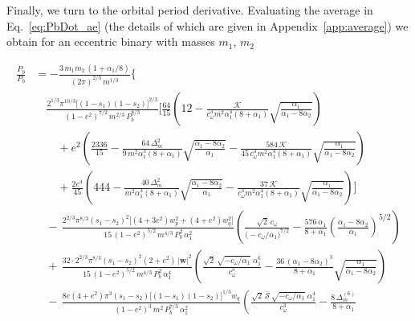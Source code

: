 \documentclass[
    floats,
    floatfix,
    amssymb,
    prd,
    twocolumn,
    superscriptaddress,
    nofootinbib,
    unicode,
    colorlinks=true,
    linktocpage=true
]{revtex4-2}
\begin{document}
Finally, we turn to the orbital period derivative. Evaluating the average in 
Eq.~\eqref{eq:PbDot_ae} (the details of which are given in 
Appendix~\ref{app:average}) we obtain for an eccentric binary with masses $m_1$, $m_2$
\begin{widetext}
\begin{equation}
\begin{split}
\frac{\dot P_b}{P_b} &=
  -\frac{3\,m_1 m_2\,(1+\alpha_1/8)}{(2\pi)^{2/3}\,m^{1/3}}
  \Biggl\{
\\[4pt]
&\quad
  \frac{2^{1/3}\pi^{10/3}\bigl[(1-s_1)(1-s_2)\bigr]^{2/3}}
       {(1-e^2)^{7/2}\,m^{2/3}\,P_b^{8/3}}
  \Biggl[
    \frac{64}{15}\!\left(12
      - \frac{\mathcal{K}}{c_\omega^3 m^2\alpha_1^4(8+\alpha_1)}
        \sqrt{\frac{\alpha_1}{\alpha_1-8\alpha_2}}
      \right)
\\&\qquad
    + e^2\!\left(
        \frac{2336}{15}
        - \frac{64\,\Delta_m^2}{9\,m^2\alpha_1^3(8+\alpha_1)}
          \sqrt{\frac{\alpha_1-8\alpha_2}{\alpha_1}}
        - \frac{584\,\mathcal{K}}{45\,c_\omega^3 m^2\alpha_1^4(8+\alpha_1)}
          \sqrt{\frac{\alpha_1}{\alpha_1-8\alpha_2}}
      \right)
\\&\qquad
    + \frac{2e^4}{45}\!\left(444
        - \frac{40\,\Delta_m^2}{m^2\alpha_1^3(8+\alpha_1)}
          \sqrt{\frac{\alpha_1-8\alpha_2}{\alpha_1}}
        - \frac{37\,\mathcal{K}}{c_\omega^3 m^2\alpha_1^4(8+\alpha_1)}
          \sqrt{\frac{\alpha_1}{\alpha_1-8\alpha_2}}
      \right)
  \Biggr]
\\[4pt]
&\quad
  -\,\frac{2^{2/3}\pi^{8/3}(s_1-s_2)^2
           \bigl[(4+3e^2)w_p^2+(4+e^2)w_q^2\bigr]}
          {15\,(1-e^2)^{5/2}\,m^{4/3}\,P_b^{2}\,\alpha_1^2}
  \left(
    \frac{\sqrt{2}\,c_\omega}{\bigl(-c_\omega/\alpha_1\bigr)^{7/2}}
    - \frac{576\,\alpha_1}{8+\alpha_1}
      \left(\frac{\alpha_1-8\alpha_2}{\alpha_1}\right)^{\!5/2}
  \right)
\\[4pt]
&\quad
  +\,\frac{32\cdot2^{2/3}\pi^{8/3}(s_1-s_2)^2(2+e^2)\,|\mathbf{w}|^2}
          {15\,(1-e^2)^{5/2}\,m^{4/3}\,P_b^{2}\,\alpha_1^4}
  \left(
    \frac{\sqrt{2}\,\sqrt{-c_\omega/\alpha_1}\;\alpha_1^6}{c_\omega^3}
    - \frac{36\,(\alpha_1-8\alpha_2)^3}{8+\alpha_1}
      \sqrt{\frac{\alpha_1}{\alpha_1-8\alpha_2}}
  \right)
\\[4pt]
&\quad
  -\,\frac{8e(4+e^2)\pi^3(s_1-s_2)\bigl[(1-s_1)(1-s_2)\bigr]^{1/3}w_q}
          {(1-e^2)^3\,m^2\,P_b^{7/3}\,\alpha_1^2}
  \left(
    \frac{\sqrt{2}\,\bar{\mathcal{S}}\,\sqrt{-c_\omega/\alpha_1}\;\alpha_1^4}
         {c_\omega^3}
    - \frac{8\,\Delta_m^{(6)}}{8+\alpha_1}

\end{split}
\end{equation}
\end{widetext}
\end{document}
